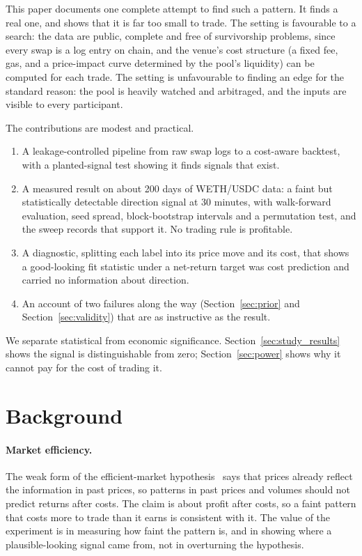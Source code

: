 \documentclass[11pt,a4paper]{article}
\begin{document}
This paper documents one complete attempt to find such a pattern. It finds a
real one, and shows that it is far too small to trade. The setting is favourable to a search: the data
are public, complete and free of survivorship problems, since every swap is a
log entry on chain, and the venue's cost structure (a fixed fee, gas, and a
price-impact curve determined by the pool's liquidity) can be computed for
each trade. The setting is unfavourable to finding an edge for the standard
reason: the pool is heavily watched and arbitraged, and the inputs are visible
to every participant.

The contributions are modest and practical.
\begin{enumerate}
\item A leakage-controlled pipeline from raw swap logs to a cost-aware
      backtest, with a planted-signal test showing it finds signals that
      exist.
\item A measured result on about 200 days of WETH/USDC data: a faint but
      statistically detectable direction signal at 30 minutes, with
      walk-forward evaluation, seed spread, block-bootstrap intervals and a
      permutation test, and the sweep records that support it. No trading
      rule is profitable.
\item A diagnostic, splitting each label into its price move and its cost,
      that shows a good-looking fit statistic under a net-return target was
      cost prediction and carried no information about direction.
\item An account of two failures along the way (Section~\ref{sec:prior} and
      Section~\ref{sec:validity}) that are as instructive as the result.
\end{enumerate}

We separate statistical from economic significance. Section~\ref{sec:study_results}
shows the signal is distinguishable from zero; Section~\ref{sec:power} shows why
it cannot pay for the cost of trading it.

\section{Background}

\paragraph{Market efficiency.}
The weak form of the efficient-market hypothesis~\cite{fama1970} says that
prices already reflect the information in past prices, so patterns in past
prices and volumes should not predict returns after costs. The claim is about
profit after costs, so a faint pattern that costs more to trade than it earns
is consistent with it. The value of the experiment is in measuring how faint
the pattern is, and in showing where a plausible-looking signal came from, not
in overturning the hypothesis.
\end{document}
